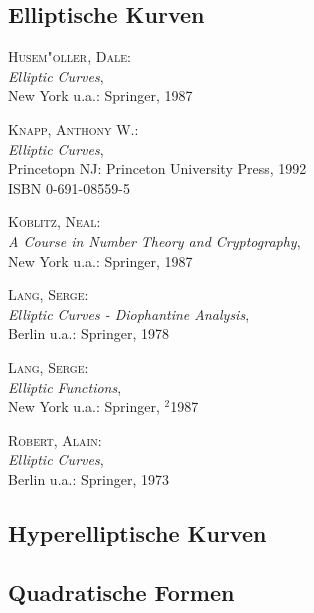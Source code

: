 
\subsection{Elliptische Kurven}

\begin{description}
  

\item \textsc{Husem"oller, Dale}: \\
  \textit{Elliptic Curves}, \\
  New York u.a.: Springer, 1987
  

\item \textsc{Knapp, Anthony W.}: \\
  \textit{Elliptic Curves}, \\
  Princetopn NJ: Princeton University Press, 1992 \\
  ISBN 0-691-08559-5
  

\item \textsc{Koblitz, Neal}: \\
  \textit{A Course in Number Theory and
    Cryptography}, \\
  New York u.a.: Springer, 1987
  

\item \textsc{Lang, Serge}: \\
  \textit{Elliptic Curves - Diophantine Analysis}, \\
  Berlin u.a.: Springer, 1978
  

\item \textsc{Lang, Serge}: \\
  \textit{Elliptic Functions}, \\
  New York u.a.: Springer, $^2$1987
  

\item \textsc{Robert, Alain}: \\
  \textit{Elliptic Curves}, \\
  Berlin u.a.: Springer, 1973

\end{description}


\subsection{Hyperelliptische Kurven}


\subsection{Quadratische Formen}

